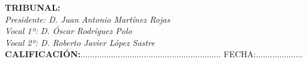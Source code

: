\begin{flushleft}
\textbf{TRIBUNAL:}\\
\vspace{1.5cm}
\textit{Presidente: D. Juan Antonio Martínez Rojas}\\
\vspace{1.5cm}
\textit{Vocal 1º: D. Óscar Rodríguez Polo}\\
\vspace{1.5cm}
\textit{Vocal 2º: D. Roberto Javier López Sastre}\\
\vspace{1.5cm}
\textbf{CALIFICACIÓN:}............................................................ FECHA:.................... \\
\end{flushleft}

\newpage
\thispagestyle{empty}
\hspace*{0.5cm}
\newpage

